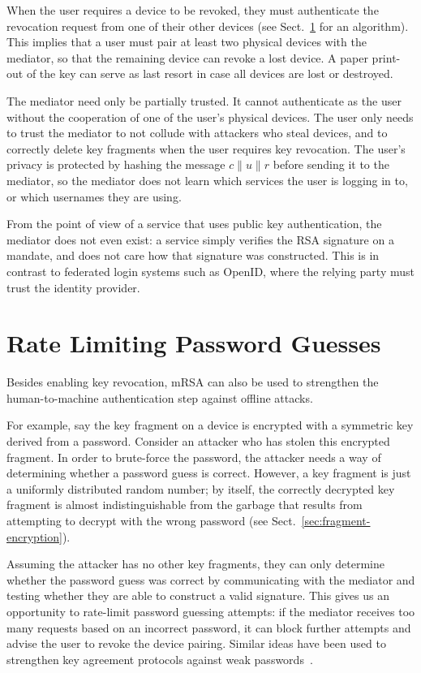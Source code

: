 \documentclass{llncs}
\newcommand*{\concat}{\mathbin{\|}}
\begin{document}
When the user requires a device to be revoked, they must authenticate the revocation request from
one of their other devices (see Sect.~\ref{sec:ratelimit} for an algorithm). This implies that a
user must pair at least two physical devices with the mediator, so that the remaining device can
revoke a lost device. A paper print-out of the key can serve as last resort in case all devices are
lost or destroyed.

The mediator need only be partially trusted. It cannot authenticate as the user without the
cooperation of one of the user's physical devices. The user only needs to trust the mediator to not
collude with attackers who steal devices, and to correctly delete key fragments when the user
requires key revocation. The user's privacy is protected by hashing the message
$c \concat u \concat r$ before sending it to the mediator, so the mediator does not learn which
services the user is logging in to, or which usernames they are using.

From the point of view of a service that uses public key authentication, the mediator does not even
exist: a service simply verifies the RSA signature on a mandate, and does not care how that
signature was constructed. This is in contrast to federated login systems such as OpenID, where the
relying party must trust the identity provider.


\section{Rate Limiting Password Guesses}\label{sec:ratelimit}

Besides enabling key revocation, mRSA can also be used to strengthen the human-to-machine
authentication step against offline attacks.

For example, say the key fragment on a device is encrypted with a symmetric key derived from a
password. Consider an attacker who has stolen this encrypted fragment. In order to brute-force the
password, the attacker needs a way of determining whether a password guess is correct. However, a
key fragment is just a uniformly distributed random number; by itself, the correctly decrypted key
fragment is almost indistinguishable from the garbage that results from attempting to decrypt with
the wrong password (see Sect.~\ref{sec:fragment-encryption}).

Assuming the attacker has no other key fragments, they can only determine whether the password guess
was correct by communicating with the mediator and testing whether they are able to construct a
valid signature. This gives us an opportunity to rate-limit password guessing attempts: if the
mediator receives too many requests based on an incorrect password, it can block further attempts
and advise the user to revoke the device pairing. Similar ideas have been used to strengthen key
agreement protocols against weak passwords~\cite{Bellovin92}.
\end{document}
